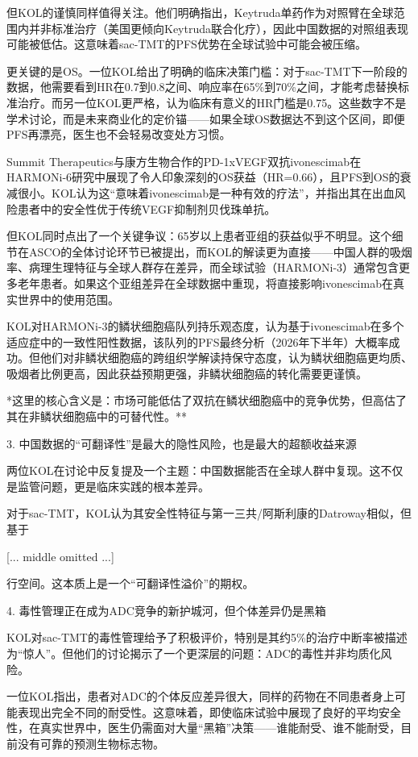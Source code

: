 \documentclass[11pt]{ctexart}
\begin{document}
但KOL的谨慎同样值得关注。他们明确指出，Keytruda单药作为对照臂在全球范围内并非标准治疗（美国更倾向Keytruda联合化疗），因此中国数据的对照组表现可能被低估。这意味着sac-TMT的PFS优势在全球试验中可能会被压缩。

更关键的是OS。一位KOL给出了明确的临床决策门槛：对于sac-TMT下一阶段的数据，他需要看到HR在0.7到0.8之间、响应率在65\%到70\%之间，才能考虑替换标准治疗。而另一位KOL更严格，认为临床有意义的HR门槛是0.75。这些数字不是学术讨论，而是未来商业化的定价锚——如果全球OS数据达不到这个区间，即便PFS再漂亮，医生也不会轻易改变处方习惯。

Summit Therapeutics与康方生物合作的PD-1xVEGF双抗ivonescimab在HARMONi-6研究中展现了令人印象深刻的OS获益（HR=0.66），且PFS到OS的衰减很小。KOL认为这“意味着ivonescimab是一种有效的疗法”，并指出其在出血风险患者中的安全性优于传统VEGF抑制剂贝伐珠单抗。

但KOL同时点出了一个关键争议：65岁以上患者亚组的获益似乎不明显。这个细节在ASCO的全体讨论环节已被提出，而KOL的解读更为直接——中国人群的吸烟率、病理生理特征与全球人群存在差异，而全球试验（HARMONi-3）通常包含更多老年患者。如果这个亚组差异在全球数据中重现，将直接影响ivonescimab在真实世界中的使用范围。

KOL对HARMONi-3的鳞状细胞癌队列持乐观态度，认为基于ivonescimab在多个适应症中的一致性阳性数据，该队列的PFS最终分析（2026年下半年）大概率成功。但他们对非鳞状细胞癌的跨组织学解读持保守态度，认为鳞状细胞癌更均质、吸烟者比例更高，因此获益预期更强，非鳞状细胞癌的转化需要更谨慎。

*这里的核心含义是：市场可能低估了双抗在鳞状细胞癌中的竞争优势，但高估了其在非鳞状细胞癌中的可替代性。**

3. 中国数据的“可翻译性”是最大的隐性风险，也是最大的超额收益来源

两位KOL在讨论中反复提及一个主题：中国数据能否在全球人群中复现。这不仅是监管问题，更是临床实践的根本差异。

对于sac-TMT，KOL认为其安全性特征与第一三共/阿斯利康的Datroway相似，但基于

[... middle omitted ...]

行空间。这本质上是一个“可翻译性溢价”的期权。

4. 毒性管理正在成为ADC竞争的新护城河，但个体差异仍是黑箱

KOL对sac-TMT的毒性管理给予了积极评价，特别是其约5\%的治疗中断率被描述为“惊人”。但他们的讨论揭示了一个更深层的问题：ADC的毒性并非均质化风险。

一位KOL指出，患者对ADC的个体反应差异很大，同样的药物在不同患者身上可能表现出完全不同的耐受性。这意味着，即使临床试验中展现了良好的平均安全性，在真实世界中，医生仍需面对大量“黑箱”决策——谁能耐受、谁不能耐受，目前没有可靠的预测生物标志物。
\end{document}
